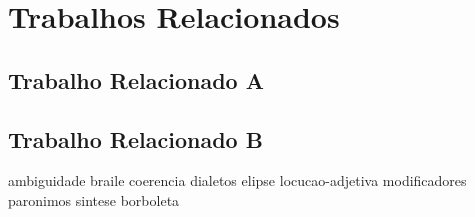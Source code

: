 \chapter{Trabalhos Relacionados}
\label{cap:trabalhos-relacionados}


\section{Trabalho Relacionado A}
\label{sec:trabalho-relacionado-a}


\section{Trabalho Relacionado B}
\label{sec:trabalho-relacionado-b}


\Gls{ambiguidade}
\Gls{braile}
\Gls{coerencia}
\Gls{dialetos}
\Gls{elipse}
\Gls{locucao-adjetiva}
\Gls{modificadores}
\Gls{paronimos}
\Gls{sintese}
\Gls{borboleta}